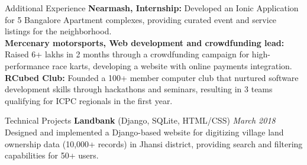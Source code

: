 \documentclass{resume} %
\begin{document}


\begin{rSection}{Additional Experience} 
    {\bf Nearmash, Internship:} Developed an Ionic Application for 5 Bangalore Apartment complexes, providing curated event and service listings for the neighborhood.
    \\{\bf Mercenary motorsports, Web development and crowdfunding lead:} Raised 6+ lakhs in 2 months through a crowdfunding campaign for high-performance race karts, developing a website with online payments integration.
    \\{\bf RCubed Club:} Founded a 100+ member computer club that nurtured software development skills through hackathons and seminars, resulting in 3 teams qualifying for ICPC regionals in the first year.
    \end{rSection}
    

\begin{rSection}{Technical Projects}
{\bf Landbank} (Django, SQLite, HTML/CSS) \hfill {\em  March 2018}
\\Designed and implemented a Django-based website for digitizing village land ownership data (10,000+ records) in Jhansi district, providing search and filtering capabilities for 50+ users.

\end{rSection}
\end{document}
